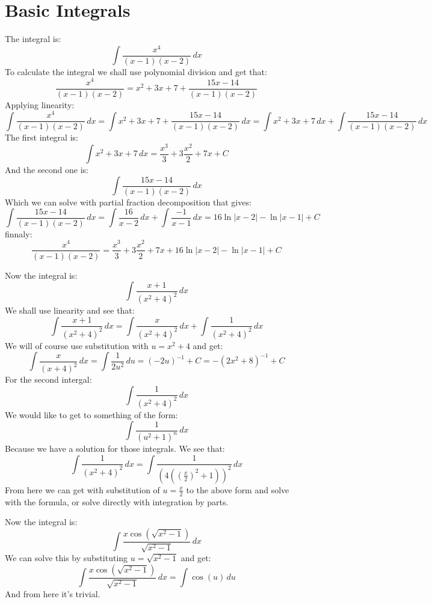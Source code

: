 \documentclass[11pt,a4paper]{article}
\begin{document}
	\maketitle
	\newpage
	\section{Basic Integrals}\label{basicintegrals}
	The integral is:
	\[
		\int{\frac{x^4}{(x-1)(x-2)}\,dx}
	\]
	To calculate the integral we shall use polynomial division and get that:
	\[
		\frac{x^4}{(x-1)(x-2)} = x^2+3x+7 + \frac{15x-14}{(x-1)(x-2)}
	\]
	Applying linearity:
	\[
		\int{\frac{x^4}{(x-1)(x-2)}\,dx} = 
		\int{x^2+3x+7 + \frac{15x-14}{(x-1)(x-2)}\,dx} = 
		\int{x^2+3x+7\,dx} + \int{\frac{15x-14}{(x-1)(x-2)}\,dx}
	\]
	The first integral is:
	\[
		\int{x^2+3x+7\,dx} = \frac{x^3}{3} + 3\frac{x^2}{2} + 7x + C
	\]
	And the second one is:
	\[
		\int{\frac{15x-14}{(x-1)(x-2)}\,dx}
	\]
	Which we can solve with partial fraction decomposition that gives:
	\[
		\int{\frac{15x-14}{(x-1)(x-2)}\,dx} = 
		\int{\frac{16}{x-2}\,dx} + \int{\frac{-1}{x-1}\,dx} = 
		16\ln|x-2| - \ln|x-1| + C
	\]
	finnaly:
	\[
		\frac{x^4}{(x-1)(x-2)} = \frac{x^3}{3} + 3\frac{x^2}{2} + 7x + 
		16\ln|x-2| - \ln|x-1| + C
	\]
	
	\newpage
	
	Now the integral is:
	\[
		\int{\frac{x+1}{(x^2+4)^2}\,dx}
	\]
	We shall use linearity and see that:
	\[
		\int{\frac{x+1}{(x^2+4)^2}\,dx} = 
		\int{\frac{x}{(x^2+4)^2}\,dx} + 
		\int{\frac{1}{(x^2+4)^2}\,dx}
	\]
	We will of course use substitution with $u=x^2+4$ and get:
	\[
		\int{\frac{x}{(x+4)^2}\,dx} = 
		\int{\frac{1}{2u^2}\,du} = 
		(-2u)^{-1} + C = 
		-(2x^2+8)^{-1} + C
	\]
	For the second intergal:
	\[
		\int{\frac{1}{(x^2+4)^2}\,dx}
	\]
	We would like to get to something of the form:
	\[
		\int{\frac{1}{(u^2+1)^n}\,dx}
	\]
	Because we have a solution for those integrals. We see that:
	\[
		\int{\frac{1}{(x^2+4)^2}\,dx} = 
		\int{\frac{1}{(4(\left(\frac{x}{2}\right)^2+1))^2}\,dx}
	\]
	From here we can get with substitution of $u = \frac{x}{2}$ to the above
	form and solve with the formula, or solve directly with integration by
	parts.
	
	\newpage
	
	Now the integral is:
	\[
		\int{\frac{x\cos(\sqrt{x^2-1})}{\sqrt{x^2-1}}\,dx}
	\]
	We can solve this by substituting $u = \sqrt{x^2-1}$ and get:
	\[
		\int{\frac{x\cos(\sqrt{x^2-1})}{\sqrt{x^2-1}}\,dx} = 
		\int{\cos(u)\,du}
	\]
	And from here it's trivial.
	
\end{document}
